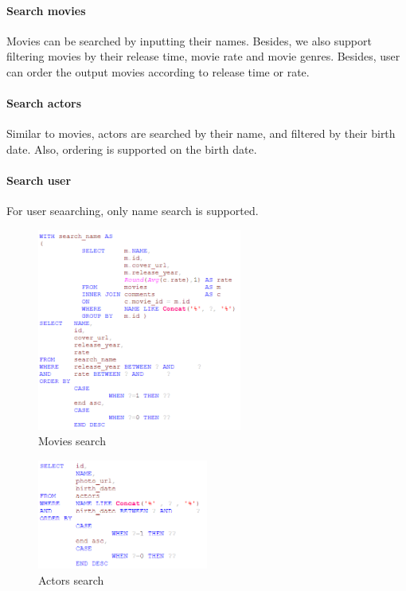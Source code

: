 \begin{CJK*}{UTF8}{gbsn}
\paragraph{Search movies}
Movies can be searched by inputting their names. Besides, we also support filtering movies by their release time, movie rate and movie genres. Besides, user can order the output movies according to release time or rate.



\paragraph{Search actors}
Similar to movies, actors are searched by their name, and filtered by their birth date. Also, ordering is supported on the birth date.





\paragraph{Search user}
For user seaarching, only name search is supported.









\begin{figure}[htbp]
\centering
\includegraphics[width=0.6\textwidth]{m_search.png}
\caption{Movies search}
\end{figure}


\begin{figure}[htbp]
\centering
\includegraphics[width=0.5\textwidth]{a_search.png}
\caption{Actors search}
\end{figure}



\end{CJK*}
